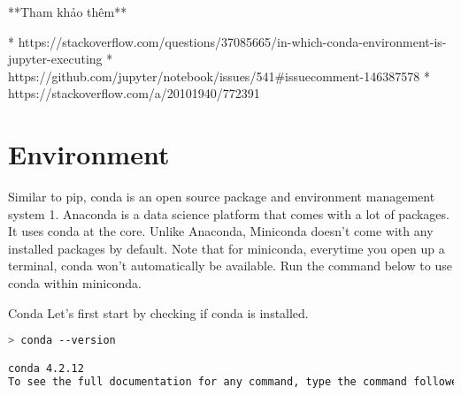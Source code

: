 **Tham khảo thêm**

* https://stackoverflow.com/questions/37085665/in-which-conda-environment-is-jupyter-executing
* https://github.com/jupyter/notebook/issues/541#issuecomment-146387578
* https://stackoverflow.com/a/20101940/772391
\section{Environment}

Similar to pip, conda is an open source package and environment management system 1. Anaconda is a data science platform that comes with a lot of packages. It uses conda at the core. Unlike Anaconda, Miniconda doesn't come with any installed packages by default. Note that for miniconda, everytime you open up a terminal, conda won't automatically be available. Run the command below to use conda within miniconda.

Conda
Let's first start by checking if conda is installed.

\begin{lstlisting}[language=bash]
> conda --version

conda 4.2.12
To see the full documentation for any command, type the command followed by --help. For example, to learn about the conda update command:
\end{lstlisting}


